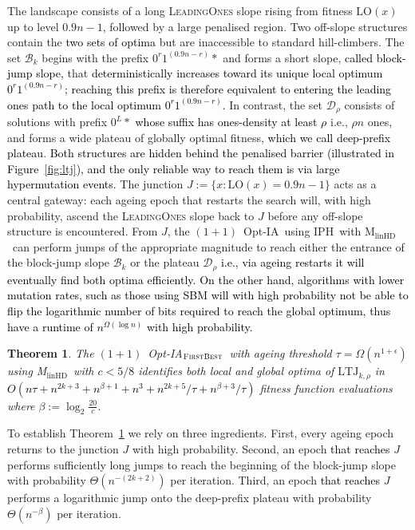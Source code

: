 \documentclass[lettersize,journal]{IEEEtran}
\newcommand{\new}[1]{\textcolor{black}{#1}}
\newcommand{\rev}[1]{\textcolor{black}{#1}}
\newcommand{\rerev}[1]{\textcolor{black}{#1}}
\newcommand{\oneoneOPTIA}{$(1+1)$~Opt-IA}
\newcommand{\linHD}{M$_{\text{linHD}}$}
\newcommand{\IPHfcm}{IPH}
\newtheorem{theorem}{Theorem}
\begin{document}
The landscape consists of a long \textsc{LeadingOnes} slope rising from fitness 
$\mathrm{LO}(x)$ up to level $0.9n-1$, followed by a large penalised region.  
Two off-slope structures contain the \textcolor{black}{two sets of optima} but are inaccessible to 
standard hill-climbers.  
The set $\mathcal{B}_k$ begins with the prefix $0^{r}1^{(0.9n-r)} *$ and forms a 
short slope, \new{called block-jump slope,} that \textcolor{black}{deterministically increases toward its unique local optimum 
\textcolor{black}{$0^{r}1^{(0.9n-r)}$}; reaching 
this prefix is therefore equivalent to entering the leading ones path to the local optimum \textcolor{black}{
$0^{r}1^{(0.9n-r)}$}.}  
In contrast, the set $\mathcal{D}_\rho$ consists of solutions with prefix 
$0^{L} *$ \textcolor{black}{whose suffix has ones-density at least $\rho$} i.e., $\rho n$ ones, and forms a wide 
plateau of globally optimal fitness, \new{which we call  deep-prefix plateau}.  
\textcolor{black}{Both structures are hidden behind the penalised barrier (illustrated in
Figure~\ref{fig:ltj}), and the only reliable way to reach them is via large
hypermutation events.}  
The junction $J := \{x : \mathrm{LO}(x)=0.9n-1\}$ acts as a central gateway: 
each ageing epoch that restarts the search will, with high probability, ascend 
the \textsc{LeadingOnes} slope back to $J$ before any off-slope structure is encountered.  
From $J$, the \oneoneOPTIA~using \IPHfcm{}~with \linHD~can perform jumps of the 
appropriate magnitude to reach either the entrance of the block-jump slope $\mathcal{B}_k$ or 
the plateau $\mathcal{D}_\rho$ \rev{i.e., via ageing restarts it will eventually find both optima efficiently.} 
\textcolor{black}{On the other hand, algorithms with lower mutation rates, such as those using SBM will with high probability not be able to flip the logarithmic number of bits required to reach the global optimum, thus have a runtime of $n^{\Omega(\log n)}$ with high probability.}

\begin{theorem} \label{thm:main-tau-final}
The  $(1+1)$~Opt-IA$_{\textsc{FirstBest}}$~with ageing threshold $\tau=\Omega(n^{1+\epsilon})$ using  \linHD~with $c<5/8$  identifies both local and global optima of  $\mathrm{LTJ}_{k,\rho}$ in
	\rerev{$O(n\tau + n^{2k+3} + n^{\beta+1} + n^3 + n^{2k+5}/\tau + n^{\beta+3}/\tau)$} fitness function evaluations	where $\beta := \log_2 \frac{20}{c}$.
\end{theorem}

To establish Theorem~\ref{thm:main-tau-final} we rely on three ingredients.
First, every ageing epoch returns to the junction $J$ with high probability.
Second, an epoch \rerev{that reaches} $J$ performs sufficiently long jumps to reach the beginning of the block-jump slope with probability $\Theta(n^{-(2k+2)})$ per iteration.
Third, an epoch \rerev{that reaches} $J$ performs a logarithmic jump onto the deep-prefix plateau with probability $\Theta(n^{-\beta})$ per iteration.
\end{document}
